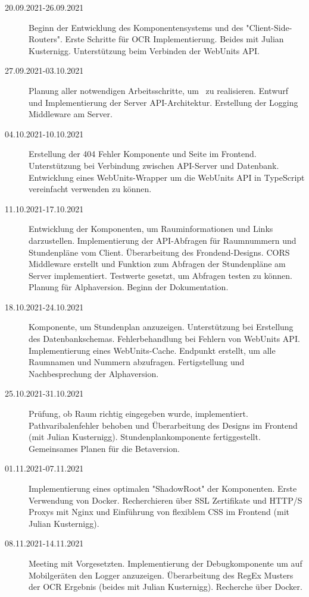 
\begin{description}
    \item[20.09.2021-26.09.2021] Beginn der Entwicklung des Komponentensystems und des "Client-Side-Routers". Erste Schritte für OCR Implementierung. Beides mit Julian Kusternigg. Unterstützung beim Verbinden der WebUnits API.
    \item[27.09.2021-03.10.2021] Planung aller notwendigen Arbeitsschritte, um \ZELIA\ zu realisieren. Entwurf und Implementierung der Server API-Architektur. Erstellung der Logging Middleware am Server.
    \item[04.10.2021-10.10.2021] Erstellung der 404 Fehler Komponente und Seite im Frontend. Unterstützung bei Verbindung zwischen API-Server und Datenbank. Entwicklung eines WebUnits-Wrapper um die WebUnits API in TypeScript vereinfacht verwenden zu können.
    \item[11.10.2021-17.10.2021] Entwicklung der Komponenten, um Rauminformationen und Links darzustellen. Implementierung der API-Abfragen für Raumnummern und Stundenpläne vom Client. Überarbeitung des Frondend-Designs. CORS Middleware erstellt und Funktion zum Abfragen der Stundenpläne am Server implementiert. Testwerte gesetzt, um Abfragen testen zu können. Planung für Alpha\-version. Beginn der Dokumentation. 
    \item[18.10.2021-24.10.2021] Komponente, um Stundenplan anzuzeigen. Unter\-stützung \linebreak bei Erstellung des Datenbank\-schemas. Fehler\-behandlung bei Fehlern von Web\-Units API. Implementierung eines Web\-Units-Cache. Endpunkt erstellt, um alle Raumnamen und Nummern abzufragen. Fertig\-stellung und Nach\-besprechung der Alpha\-version.
    \item[25.10.2021-31.10.2021] Prüfung, ob Raum richtig eingegeben wurde, implementiert. Pathvaribalenfehler behoben und Überarbeitung des Designs im Frontend (mit Julian Kusternigg). Stundenplankomponente fertiggestellt. Gemeinsames Planen für die Betaversion. 
    \item[01.11.2021-07.11.2021] Implementierung eines optimalen "ShadowRoot" der Komponenten. Erste Verwendung von Docker. Recherchieren über SSL Zertifikate und HTTP/S Proxys mit Nginx und Einführung von flexiblem CSS im Frontend (mit Julian Kusternigg).
    \item[08.11.2021-14.11.2021] Meeting mit Vorgesetzten. Implementierung der Debugkomponente um auf Mobilgeräten den Logger anzuzeigen. Überarbeitung des RegEx Musters der OCR Ergebnis (beides mit Julian Kusternigg). Recherche über Docker.

\end{description}
